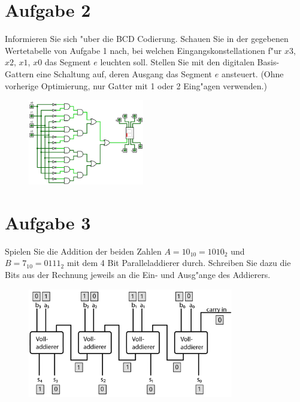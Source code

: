 \documentclass[10pt, oneside]{article}
\begin{document}
\section{Aufgabe 2}

Informieren Sie sich "uber die BCD Codierung. Schauen Sie in der gegebenen
Wertetabelle von Aufgabe 1 nach, bei welchen Eingangskonstellationen f"ur $x3$,
$x2$, $x1$, $x0$ das Segment $e$ leuchten soll. Stellen Sie mit den digitalen
Basis-Gattern eine Schaltung auf, deren Ausgang das Segment $e$ ansteuert.
(Ohne vorherige Optimierung, nur Gatter mit 1 oder 2 Eing"agen verwenden.)

\begin{figure}[h]
    \centering
    \includegraphics[width=0.45\textwidth]{./assets/aufgabe-2.png}
\end{figure}

\pagebreak
\section{Aufgabe 3}

Spielen Sie die Addition der beiden Zahlen $A = 10_10 = 1010_2$ und $B = 7_10 =
0111_2$ mit dem 4 Bit Paralleladdierer durch. Schreiben Sie dazu die Bits aus
der Rechnung jeweils an die Ein- und Ausg"ange des Addierers.

\begin{figure}[h]
    \centering
    \includegraphics[width=0.8\textwidth]{./assets/aufgabe-3.png}
\end{figure}
\end{document}
